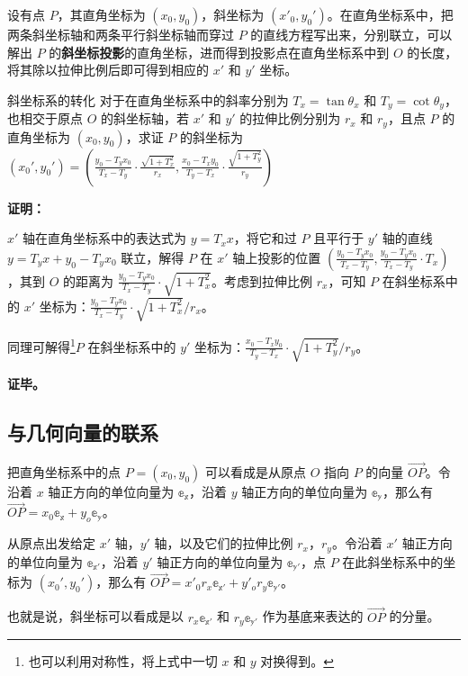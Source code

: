 设有点 $P$，其直角坐标为 $(x_0, y_0)$，斜坐标为 $(x'_0, y_0')$。在直角坐标系中，把两条斜坐标轴和两条平行斜坐标轴而穿过 $P$ 的直线方程写出来，分别联立，可以解出 $P$ 的\textbf{斜坐标投影}的直角坐标，进而得到投影点在直角坐标系中到 $O$ 的长度，将其除以拉伸比例后即可得到相应的 $x'$ 和 $y'$ 坐标。

\begin{example}{斜坐标系的转化}
对于在直角坐标系中的斜率分别为 $T_x=\tan{\theta_x}$ 和 $T_y=\cot{\theta_y}$，也相交于原点 $O$ 的斜坐标轴，若 $x'$ 和 $y'$ 的拉伸比例分别为 $r_x$ 和 $r_y$，且点 $P$ 的直角坐标为 $(x_0, y_0)$，求证 $P$ 的斜坐标为 $(x_0', y_0')=(\frac{y_0-T_yx_0}{T_x-T_y}\cdot\frac{\sqrt{1+T_x^2}}{r_x}, \frac{x_0-T_xy_0}{T_y-T_x}\cdot\frac{\sqrt{1+T_y^2}}{r_y})$
\end{example}

\textbf{证明：}

$x'$ 轴在直角坐标系中的表达式为 $y=T_xx$，将它和过 $P$ 且平行于 $y'$ 轴的直线 $y=T_yx+y_0-T_yx_0$ 联立，解得 $P$ 在 $x'$ 轴上投影的位置 $(\frac{y_0-T_yx_0}{T_x-T_y}, \frac{y_0-T_yx_0}{T_x-T_y}\cdot T_x)$，其到 $O$ 的距离为 $\frac{y_0-T_yx_0}{T_x-T_y}\cdot\sqrt{1+T_x^2}$。考虑到拉伸比例 $r_x$，可知 $P$ 在斜坐标系中的 $x'$ 坐标为：$\frac{y_0-T_yx_0}{T_x-T_y}\cdot\sqrt{1+T_x^2}/r_x$。

同理可解得\footnote{也可以利用对称性，将上式中一切 $x$ 和 $y$ 对换得到。}$P$ 在斜坐标系中的 $y'$ 坐标为：$\frac{x_0-T_xy_0}{T_y-T_x}\cdot\sqrt{1+T_y^2}/r_y$。

\textbf{证毕。}

\subsection{与几何向量的联系}

把直角坐标系中的点 $P=(x_0, y_0)$ 可以看成是从原点 $O$ 指向 $P$ 的向量 $\overrightarrow{OP}$。令沿着 $x$ 轴正方向的单位向量为 $\mathbb{e_x}$，沿着 $y$ 轴正方向的单位向量为 $\mathbb{e_y}$，那么有 $\overrightarrow{OP}=x_0\mathbb{e_x}+y_o\mathbb{e_y}$。

从原点出发给定 $x'$ 轴，$y'$ 轴，以及它们的拉伸比例 $r_x$，$r_y$。令沿着 $x'$ 轴正方向的单位向量为 $\mathbb{e_{x'}}$，沿着 $y'$ 轴正方向的单位向量为 $\mathbb{e_{y'}}$，点 $P$ 在此斜坐标系中的坐标为 $(x_0',y_0')$，那么有 $\overrightarrow{OP}=x'_0r_x\mathbb{e_{x'}}+y'_or_y\mathbb{e_{y'}}$。

也就是说，斜坐标可以看成是以 $r_x\mathbb{e_{x'}}$ 和 $r_y\mathbb{e_{y'}}$ 作为基底来表达的 $\overrightarrow{OP}$ 的分量。




